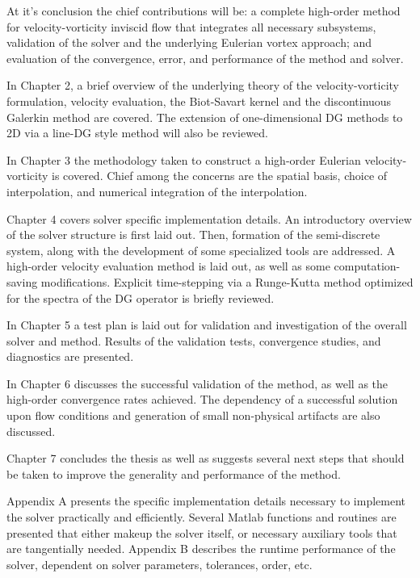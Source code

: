 \documentclass[letterpaper,12pt]{report}
\begin{document}
At it's conclusion the chief contributions will be: a complete high-order method for velocity-vorticity inviscid flow that integrates all necessary subsystems, validation of the solver and the underlying Eulerian vortex approach; and evaluation of the convergence, error, and performance of the method and solver.

In Chapter 2, a brief overview of the underlying theory of the velocity-vorticity formulation, velocity evaluation, the Biot-Savart  kernel and the discontinuous Galerkin method are covered. The extension of one-dimensional DG methods to 2D via a line-DG \cite{Persson2013} style method will also be reviewed. 

In Chapter 3 the methodology taken to construct a high-order Eulerian velocity-vorticity is covered. Chief among the concerns are the spatial basis, choice of interpolation, and numerical integration of the interpolation.

Chapter 4 covers solver specific implementation details. An introductory overview of the solver structure is first laid out. Then, formation of the semi-discrete system, along with the development of some specialized tools are addressed. A high-order velocity evaluation method is laid out, as well as some computation-saving modifications. Explicit time-stepping via a Runge-Kutta method optimized for the spectra of the DG operator is briefly reviewed.

In Chapter 5 a test plan is laid out for validation and investigation of the overall solver and method. Results of the validation tests, convergence studies, and diagnostics are presented.

In Chapter 6 discusses the successful validation of the method, as well as the high-order convergence rates achieved. The dependency of a successful solution upon flow conditions and generation of small non-physical artifacts are also discussed.

Chapter 7 concludes the thesis as well as suggests several next steps that should be taken to improve the generality and performance of the method.

Appendix A presents the specific implementation details necessary to implement the solver practically and efficiently. Several Matlab functions and routines are presented that either makeup the solver itself, or necessary auxiliary tools that are tangentially needed. Appendix B describes the runtime performance of the solver, dependent on solver parameters, tolerances, order, etc.

\end{document}
